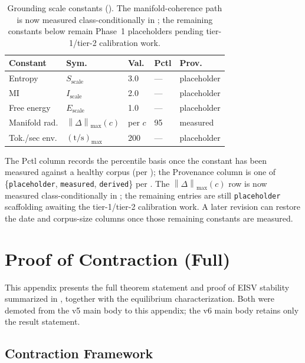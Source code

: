 \documentclass[11pt,twocolumn]{article}
\newcommand{\norm}[1]{\left\lVert #1 \right\rVert}
\begin{document}
\begin{table}[htbp]
\centering
\footnotesize
\caption{Grounding scale constants (). The
manifold-coherence path is now measured class-conditionally in
; the remaining constants below remain
Phase~1 placeholders pending tier-1/tier-2 calibration work.}
\label{tab:scale-constants}
\setlength{\tabcolsep}{4pt}
\begin{tabular}{@{}lllll@{}}
\toprule
\textbf{Constant} & \textbf{Sym.} & \textbf{Val.} & \textbf{Pctl} & \textbf{Prov.} \\
\midrule
Entropy & $S_{\text{scale}}$ & 3.0 & --- & placeholder \\
MI & $I_{\text{scale}}$ & 2.0 & --- & placeholder \\
Free energy & $E_{\text{scale}}$ & 1.0 & --- & placeholder \\
Manifold rad. & $\norm{\Delta}_{\max}(c)$ & per $c$ & 95 & measured \\
Tok./sec env. & $(\text{t/s})_{\max}$ & 200 & --- & placeholder \\
\bottomrule
\end{tabular}
\end{table}

The Pctl column records the percentile basis once the constant
has been measured against a healthy corpus (per
); the Provenance column is one of
\{\texttt{placeholder}, \texttt{measured}, \texttt{derived}\}
per . The $\norm{\Delta}_{\max}(c)$ row is now
measured class-conditionally in ; the remaining
entries are still \texttt{placeholder} scaffolding awaiting the
tier-1/tier-2 calibration work. A later revision can restore the
date and corpus-size columns once those remaining constants are
measured.


\section{Proof of Contraction (Full)}
\label{app:contraction-proof}

This appendix presents the full theorem statement and proof of
EISV stability summarized in , together with
the equilibrium characterization. Both were demoted from the v5
main body to this appendix; the v6 main body retains only the
result statement.

\subsection*{Contraction Framework}
\end{document}
